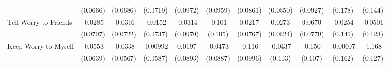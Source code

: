 {\begin{tabular}{l*{10}{c}}
            &    (0.0666)         &    (0.0686)         &    (0.0719)         &    (0.0972)         &    (0.0959)         &    (0.0861)         &    (0.0850)         &    (0.0927)         &     (0.178)         &     (0.144)         \\
\addlinespace
Tell Worry to Friends&     -0.0285         &     -0.0316         &     -0.0152         &     -0.0314         &      -0.101         &      0.0217         &      0.0273         &      0.0670         &     -0.0254         &     -0.0501         \\
            &    (0.0707)         &    (0.0722)         &    (0.0737)         &    (0.0970)         &     (0.105)         &    (0.0767)         &    (0.0824)         &    (0.0779)         &     (0.146)         &     (0.123)         \\
\addlinespace
Keep Worry to Myself&     -0.0553         &     -0.0338         &    -0.00992         &      0.0197         &     -0.0473         &      -0.116         &     -0.0437         &      -0.150         &    -0.00607         &      -0.168         \\
            &    (0.0639)         &    (0.0567)         &    (0.0587)         &    (0.0893)         &    (0.0887)         &    (0.0996)         &     (0.103)         &     (0.107)         &     (0.162)         &     (0.127)         \\
\bottomrule
\end{tabular}
}
